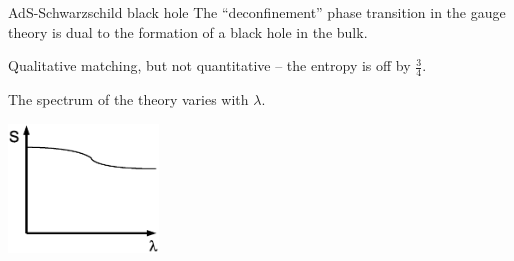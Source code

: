 \documentclass[%
pdf,
colorBG, slideColor,
total,
serpaggi
%
]{prosper}
\begin{document}

\begin{slide}{AdS-Schwarzschild black hole}
%
 The ``deconfinement'' phase transition in the gauge theory is dual
 to the formation of a black hole in the bulk.

 \vp Qualitative matching, but not quantitative -- the entropy is
 off by $\frac{3}{4}$.

 \vp The spectrum of the theory varies with $\lambda$.
 \begin{center}
    \includegraphics[width=4cm]{bhent.eps}
 \end{center}
%
\end{slide}



\end{document}
